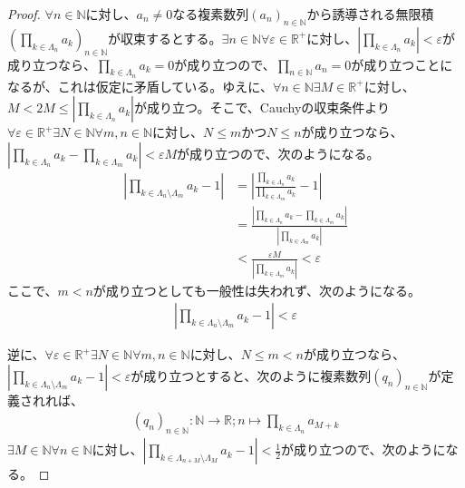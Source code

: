 \documentclass[dvipdfmx]{jsarticle}
\begin{document}
\begin{proof}
$\forall n \in \mathbb{N}$に対し、$a_{n} \neq 0$なる複素数列$\left( a_{n} \right)_{n \in \mathbb{N}}$から誘導される無限積$\left( \prod_{k \in \varLambda_{n}} a_{k} \right)_{n \in \mathbb{N}}$が収束するとする。$\exists n \in \mathbb{N}\forall\varepsilon \in \mathbb{R}^{+}$に対し、$\left| \prod_{k \in \varLambda_{n}} a_{k} \right| < \varepsilon$が成り立つなら、$\prod_{k \in \varLambda_{n}} a_{k} = 0$が成り立つので、$\prod_{n \in \mathbb{N}} a_{n} = 0$が成り立つことになるが、これは仮定に矛盾している。ゆえに、$\forall n \in \mathbb{N}\exists M \in \mathbb{R}^{+}$に対し、$M < 2M \leq \left| \prod_{k \in \varLambda_{n}} a_{k} \right|$が成り立つ。そこで、Cauchyの収束条件より$\forall\varepsilon \in \mathbb{R}^{+}\exists N \in \mathbb{N}\forall m,n \in \mathbb{N}$に対し、$N \leq m$かつ$N \leq n$が成り立つなら、$\left| \prod_{k \in \varLambda_{n}} a_{k} - \prod_{k \in \varLambda_{m}} a_{k} \right| < \varepsilon M$が成り立つので、次のようになる。
\begin{align*}
\left| \prod_{k \in \varLambda_{n} \setminus \varLambda_{m}} a_{k} - 1 \right| &= \left| \frac{\prod_{k \in \varLambda_{n}} a_{k}}{\prod_{k \in \varLambda_{m}} a_{k}} - 1 \right|\\
&= \frac{\left| \prod_{k \in \varLambda_{n}} a_{k} - \prod_{k \in \varLambda_{m}} a_{k} \right|}{\left| \prod_{k \in \varLambda_{m}} a_{k} \right|}\\
&< \frac{\varepsilon M}{\left| \prod_{k \in \varLambda_{m}} a_{k} \right|} < \varepsilon
\end{align*}
ここで、$m < n$が成り立つとしても一般性は失われず、次のようになる。
\begin{align*}
\left| \prod_{k \in \varLambda_{n} \setminus \varLambda_{m}} a_{k} - 1 \right| < \varepsilon
\end{align*}\par
逆に、$\forall\varepsilon \in \mathbb{R}^{+}\exists N \in \mathbb{N}\forall m,n \in \mathbb{N}$に対し、$N \leq m < n$が成り立つなら、$\left| \prod_{k \in \varLambda_{n} \setminus \varLambda_{m}} a_{k} - 1 \right| < \varepsilon$が成り立つとすると、次のように複素数列$\left( q_{n} \right)_{n \in \mathbb{N}}$が定義されれば、
\begin{align*}
\left( q_{n} \right)_{n \in \mathbb{N}}:\mathbb{N} \rightarrow \mathbb{R};n \mapsto \prod_{k \in \varLambda_{n}} a_{M + k}
\end{align*}
$\exists M \in \mathbb{N}\forall n \in \mathbb{N}$に対し、$\left| \prod_{k \in \varLambda_{n + M} \setminus \varLambda_{M}} a_{k} - 1 \right| < \frac{1}{2}$が成り立つので、次のようになる。

\end{proof}
\end{document}
